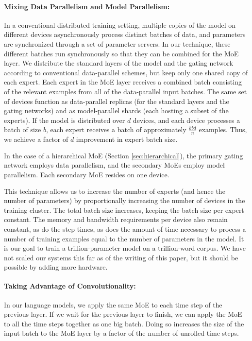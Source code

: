 \documentclass{article}
\begin{document}
\paragraph{Mixing Data Parallelism and Model Parallelism:}  In a conventional distributed training setting, multiple copies of the model on different devices asynchronously process distinct batches of data, and parameters are synchronized through a set of parameter servers.  In our technique, these different batches run synchronously so that they can be combined for the MoE layer.  We distribute the standard layers of the model and the gating network according to conventional data-parallel schemes, but keep only one shared copy of each expert.  Each expert in the MoE layer receives a combined batch consisting of the relevant examples from all of the data-parallel input batches.   The same set of devices function as data-parallel replicas (for the standard layers and the gating networks) and as model-parallel shards (each hosting a subset of the experts).  If the model is distributed over $d$ devices, and each device processes a batch of size $b$, each expert receives a batch of approximately $\frac{kbd}{n}$ examples. Thus, we achieve a factor of $d$ improvement in expert batch size. 

In the case of a hierarchical MoE (Section \ref{sec:hierarchical}), the primary gating network employs data parallelism, and the secondary MoEs employ model parallelism.  Each secondary MoE resides on one device.

This technique allows us to increase the number of experts (and hence the number of parameters) by proportionally increasing the number of devices in the training cluster.   The total batch size increases, keeping the batch size per expert constant.   The memory and bandwidth requirements per device also remain constant, as do the step times, as does the amount of time necessary to process a number of training examples equal to the number of parameters in the model.  It is our goal to train a trillion-parameter model on a trillion-word corpus.  We have not scaled our systems this far as of the writing of this paper, but it should be possible by adding more hardware.

\paragraph{Taking Advantage of Convolutionality:} In our language models, we apply the same MoE to each time step of the previous layer. If we wait for the previous layer to finish, we can apply the MoE to all the time steps together as one big batch.  Doing so increases the size of the input batch to the MoE layer by a factor of the number of unrolled time steps.
\end{document}
